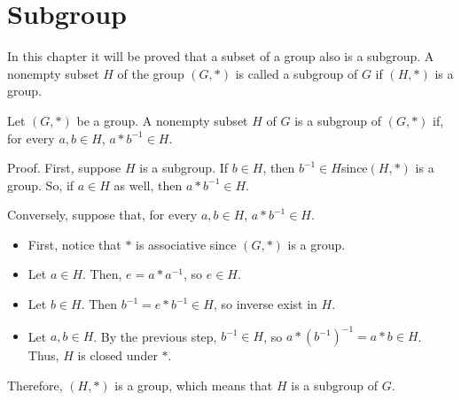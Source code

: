 \section{Subgroup}
In this chapter it will be proved that a subset of a group also is a subgroup.
A nonempty subset $H$ of the group $(G,*)$ is called a subgroup of $G$ if $(H,*)$ is a group.

Let $(G,*)$ be a group. A nonempty subset $H$ of $G$ is a subgroup of $(G,*)$ if, for every $a, b \in H$, $a * b^{-1} \in H$.

Proof. First, suppose $H$ is a subgroup. If $b \in H$, then $b^{-1} \in H $since$ (H,*)$ is a group. So, if $a \in H$ as well, then $a * b^{-1} \in H$.

Conversely, suppose that, for every $a, b \in H$, $a * b^{-1} \in H$.

\begin {itemize}
\item First, notice that $*$ is associative since $(G,*)$ is a group.
\item Let $a \in H$. Then, $e = a * a^{-1}$, so $e \in H$.
\item Let $b \in H$. Then $b^{-1} = e * b^{-1} \in H$, so inverse exist in $H$.
\item Let $a, b \in H$. By the previous step, $b^{-1} \in H$, so $a* (b^{-1})^{-1} = a* b \in H$. Thus, $H$ is closed under $*$.
\end {itemize}

Therefore, $(H,*)$ is a group, which means that $H$ is a subgroup of $G$.
